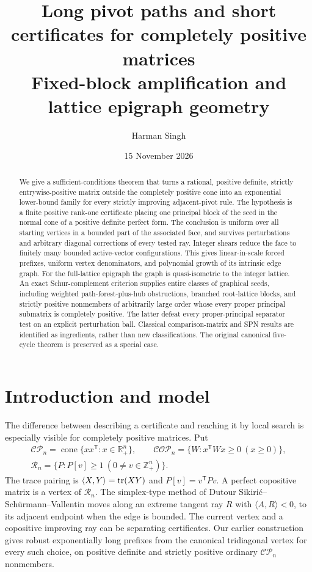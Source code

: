 \documentclass[11pt]{article}
\title{Long pivot paths and short certificates for completely positive matrices\\[3pt]\large Fixed-block amplification and lattice epigraph geometry}
\author{Harman Singh}
\date{15 November 2026}
\theoremstyle{definition}\newtheorem{definition}[theorem]{Definition}
\theoremstyle{remark}\newtheorem{remark}[theorem]{Remark}
\newcommand{\R}{\mathbb R}\newcommand{\Q}{\mathbb Q}\newcommand{\Z}{\mathbb Z}
\newcommand{\CP}{\mathcal{CP}}\newcommand{\COP}{\mathcal{COP}}\newcommand{\Ry}{\mathcal R}
\newcommand{\cone}{\operatorname{cone}}\newcommand{\ip}[2]{\langle #1,#2\rangle}
\newcommand{\T}{^{\mathsf T}}\newcommand{\norm}[1]{\lVert #1\rVert}
\begin{document}
\maketitle
\begin{abstract}
We give a sufficient-conditions theorem that turns a rational, positive definite, strictly entrywise-positive matrix outside the completely positive cone into an exponential lower-bound family for every strictly improving adjacent-pivot rule. The hypothesis is a finite positive rank-one certificate placing one principal block of the seed in the normal cone of a positive definite perfect form. The conclusion is uniform over all starting vertices in a bounded part of the associated face, and survives perturbations and arbitrary diagonal corrections of every tested ray. Integer shears reduce the face to finitely many bounded active-vector configurations. This gives linear-in-scale forced prefixes, uniform vertex denominators, and polynomial growth of its intrinsic edge graph. For the full-lattice epigraph the graph is quasi-isometric to the integer lattice. An exact Schur-complement criterion supplies entire classes of graphical seeds, including weighted path-forest-plus-hub obstructions, branched root-lattice blocks, and strictly positive nonmembers of arbitrarily large order whose every proper principal submatrix is completely positive. The latter defeat every proper-principal separator test on an explicit perturbation ball. Classical comparison-matrix and SPN results are identified as ingredients, rather than new classifications. The original canonical five-cycle theorem is preserved as a special case.
\end{abstract}

\section{Introduction and model}
The difference between describing a certificate and reaching it by local search is especially visible for completely positive matrices. Put
\[
 \begin{gathered}
 \CP_n=\cone\{xx\T:x\in\R_+^n\},\qquad
 \COP_n=\{W:x\T Wx\ge0\ (x\ge0)\},\\
 \Ry_n=\{P:P[v]\ge1\ (0\ne v\in\Z_+^n)\}.
 \end{gathered}
\]
The trace pairing is $\ip X Y=\tr(XY)$ and $P[v]=v\T Pv$. A perfect copositive matrix is a vertex of $\Ry_n$. The simplex-type method of Dutour Sikiri\'c--Sch\"urmann--Vallentin \cite{DSV} moves along an extreme tangent ray $R$ with $\ip A R<0$, to its adjacent endpoint when the edge is bounded. The current vertex and a copositive improving ray can be separating certificates. Our earlier construction \cite{Baseline} gives robust exponentially long prefixes from the canonical tridiagonal vertex for every such choice, on positive definite and strictly positive ordinary $\CP_n$ nonmembers.
\end{document}
